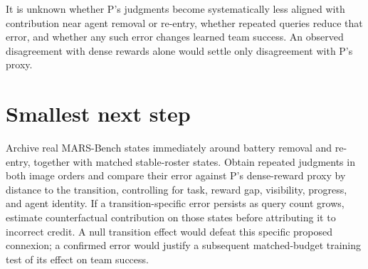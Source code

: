 \documentclass{article}
\begin{document}
It is unknown whether P's judgments become systematically less aligned with contribution near agent removal or re-entry, whether repeated queries reduce that error, and whether any such error changes learned team success. An observed disagreement with dense rewards alone would settle only disagreement with P's proxy. 

\section{Smallest next step}

Archive real MARS-Bench states immediately around battery removal and re-entry, together with matched stable-roster states. Obtain repeated judgments in both image orders and compare their error against P's dense-reward proxy by distance to the transition, controlling for task, reward gap, visibility, progress, and agent identity. If a transition-specific error persists as query count grows, estimate counterfactual contribution on those states before attributing it to incorrect credit. A null transition effect would defeat this specific proposed connexion; a confirmed error would justify a subsequent matched-budget training test of its effect on team success. 
\end{document}

